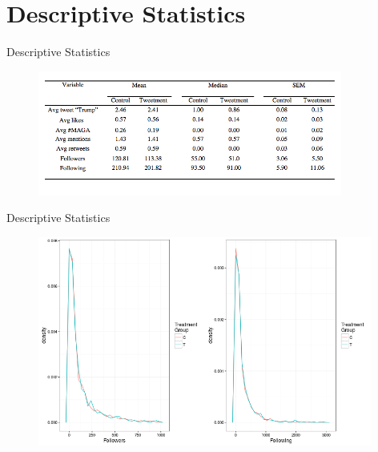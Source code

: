 \documentclass[10pt]{beamer}\usepackage[]{graphicx}\usepackage[]{color}
\begin{document}
\section{Descriptive Statistics}
\begin{frame}{Descriptive Statistics}


\begin{figure}
\includegraphics[width=10cm]{../tables/descriptive.png}
\end{figure}

% 
\end{frame}


\begin{frame}{Descriptive Statistics}

\begin{figure}
\includegraphics[width=11cm]{../plots/hists.png}
\end{figure}

\end{frame}
\end{document}
